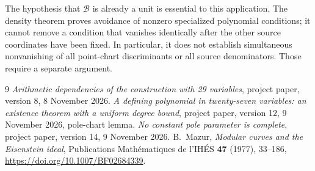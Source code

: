 \documentclass[11pt,a4paper]{article}
\begin{document}
The hypothesis that $\mathcal B$ is already a unit is essential to
this application.  The density theorem proves avoidance of nonzero
specialized polynomial conditions; it cannot remove a condition
that vanishes identically after the other source coordinates have
been fixed.  In particular, it does not establish simultaneous
nonvanishing of all point-chart discriminants or all source
denominators.  Those require a separate argument.

\begin{thebibliography}{9}
\emph{Arithmetic dependencies of the construction with 29 variables},
project paper, version 8, 8 November 2026.
\emph{A defining polynomial in twenty-seven variables:
an existence theorem with a uniform degree bound},
project paper, version 12, 9 November 2026, pole-chart lemma.
\emph{No constant pole parameter is complete},
project paper, version 14, 9 November 2026.
B.~Mazur, \emph{Modular curves and the Eisenstein ideal},
Publications Math\'ematiques de l'IH\'ES \textbf{47} (1977), 33--186,
\url{https://doi.org/10.1007/BF02684339}.
\end{thebibliography}
\end{document}
